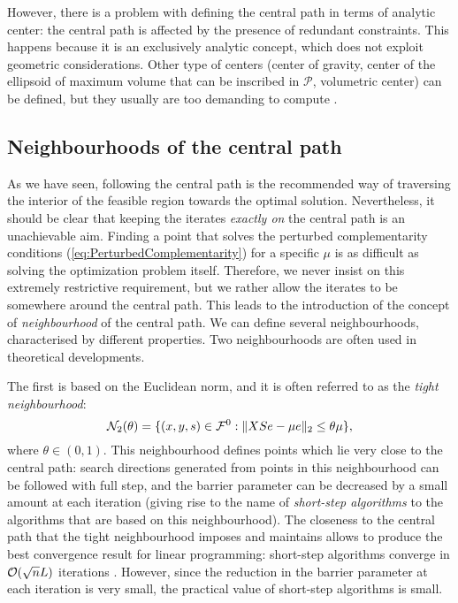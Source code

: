 However, there is a problem with defining the central path in terms
of analytic center: the central path is affected by the presence of 
redundant constraints. 
This happens because it is an exclusively analytic concept, which does
not exploit geometric considerations.
Other type of centers (center of gravity, center of the ellipsoid of 
maximum volume that can be inscribed in $\mathcal{P}$, volumetric center) 
can be defined, but they usually are too demanding to compute 
\cite{Gonzaga92}. 


%
%
\subsection{Neighbourhoods of the central path}
\label{sec:Neighbourhoods}

As we have seen, following the central path is the recommended
way of traversing the interior of the feasible region towards
the optimal solution. Nevertheless, it should be clear that keeping the
iterates {\em exactly on} the central path is an unachievable aim.
Finding a point that solves the perturbed complementarity conditions 
(\ref{eq:PerturbedComplementarity}) for a specific $\mu$ 
is as difficult as solving the optimization problem itself.
%
Therefore, we never insist on this extremely restrictive requirement,
but we rather allow the iterates to be somewhere around the central path.
This leads to the introduction of the concept of
{\em neighbourhood} of the central path. 
We can define several neighbourhoods, characterised
by different properties.
Two neighbourhoods are often used in theoretical developments.

The first is based on the Euclidean norm, and it is often referred
to as the {\em tight neighbourhood}:
\[
\mathcal{N}_2(\theta) = \{ (x,y,s) \in \mathcal{F}^0 :
                         \| XSe - \mu e \|_2 \le \theta\mu \},
\]
where $\theta \in (0,1)$.
This neighbourhood defines points which lie very close to the central path:
search directions generated from points in this neighbourhood can be 
followed with full step, and the barrier parameter can be decreased
by a small amount at each iteration (giving rise to the name
of {\em short-step algorithms} to the algorithms that are based on
this neighbourhood). 
The closeness to the central path that the tight neighbourhood
imposes and maintains allows to produce the best convergence result
for linear programming: short-step algorithms converge in 
$\mathcal{O}(\sqrt{n}L)$ iterations \cite{KojimaMizunoYoshise89b,MonteiroAdler89a}.
However, since the reduction in the barrier parameter at each iteration 
is very small, the practical value of short-step algorithms is small.

